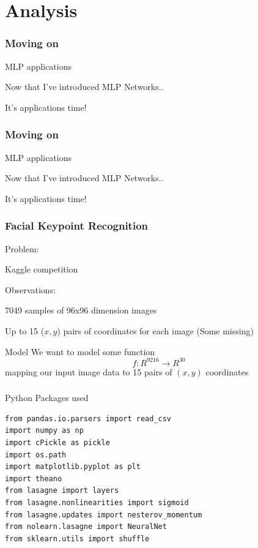 \documentclass{beamer}
\begin{document}
\section{Analysis}


\begin{frame}
    \frametitle{Moving on}
    \begin{block}{MLP applications}
    \item Now that I've introduced MLP Networks..
    \item It's applications time!
    \end{block}
\end{frame}

\begin{frame}
    \frametitle{Moving on}
    \begin{block}{MLP applications}
    \item Now that I've introduced MLP Networks..
    \item It's applications time!
    \end{block}
\end{frame}

\begin{frame}
    \frametitle{Facial Keypoint Recognition}
    \begin{block}{Problem:}
    \item Kaggle competition
    \end{block}
    \begin{block}{Observations:}
    \item 7049 samples of 96x96 dimension images
    \item Up to 15 ($x,y$) pairs of coordinates for each image (Some missing)
    \end{block}
    \begin{block}{Model} We want to model some function $$f : R^{9216} \rightarrow R^{30}$$
    mapping our input image data to 15 pairs of $(x,y)$ coordinates 
    \end{block}
\end{frame}

\begin{frame}[fragile]
\frametitle{}
\begin{block}{Python Packages used}
\begin{verbatim}
from pandas.io.parsers import read_csv
import numpy as np
import cPickle as pickle
import os.path
import matplotlib.pyplot as plt
import theano
from lasagne import layers
from lasagne.nonlinearities import sigmoid
from lasagne.updates import nesterov_momentum
from nolearn.lasagne import NeuralNet
from sklearn.utils import shuffle

\end{verbatim}
\end{block}
\end{frame}
\end{document}
